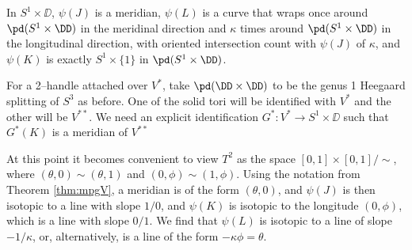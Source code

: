 	In $S^1\times\DD$, $\psi(J)$ is a meridian, $\psi(L)$ is a curve that wraps once around $\pd(S^1\times\DD)$ in the meridinal direction and $\kappa$ times around $\pd(S^1\times\DD)$ in the longitudinal direction, with oriented intersection count with $\psi(J)$ of $\kappa$, and $\psi(K)$ is exactly $S^1\times\{1\}$ in $\pd(S^1\times\DD)$.
	
	For a 2--handle attached over $V^*$, take $\pd (\DD\times\DD)$ to be the genus 1 Heegaard splitting of $S^3$ as before.
	One of the solid tori will be identified with $V^*$ and the other will be $V^{**}$.
	We need an explicit identification $G^*:V^*\to S^1\times\DD$ such that $G^*(K)$ is a meridian of $V^{**}$
	
	At this point it becomes convenient to view $T^2$ as the space $[0,1]\times[0,1]/\sim$, where $(\theta,0)\sim(\theta,1)$ and $(0,\phi)\sim(1,\phi)$.
	Using the notation from Theorem \ref{thm:mpgV}, a meridian is of the form $(\theta,0)$, and $\psi(J)$ is then isotopic to a line with slope $1/0$, and $\psi(K)$ is isotopic to the longitude $(0,\phi)$, which is a line with slope $0/1$.
	We find that $\psi(L)$ is isotopic to a line of slope $-1/\kappa$, or, alternatively, is a line of the form $-\kappa\phi=\theta$.